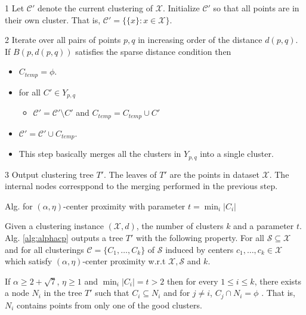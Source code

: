 \documentclass[11pt]{article}
\newcommand{\mc}{\mathcal}
\newenvironment{alg}{
    \begin{list}{}{
        \setlength{\itemsep}{2pt}
        \setlength{\parsep}{0pt}
        \setlength{\parskip}{0pt}
        \setlength{\topsep}{1pt}
    }
}
{
    \end{list}
}
\begin{document}
\begin{algorithm}[!ht]
\begin{alg}
	\item[1] Let $\mc C'$ denote the current clustering of $\mc X$. Initialize $\mc C'$ so that all points are in their own cluster. That is, $\mc C' = \{ \{x\}: x \in \mc X\}$.
	\item[2] Iterate over all pairs of points $p, q$ in increasing order of the distance $d(p, q)$. If $B(p, d(p, q))$ satisfies the sparse distance condition then
	\begin{itemize}
	\renewcommand\labelitemi{}
		\item $C_{temp} = \phi$. 
		\item for all $C' \in Y_{p,q}$
		\begin{itemize}
		\renewcommand\labelitemii{}
			\item $\mc C' = \mc C' \setminus C'$ and $C_{temp} = C_{temp} \cup C'$
		\end{itemize}
		\item $\mc C' = \mc C' \cup C_{temp}$.
		\item This step basically merges all the clusters in $Y_{p, q}$ into a single cluster.
	\end{itemize}
	\item[3] Output clustering tree $T'$. The leaves of $T'$ are the points in dataset $\mc X$. The internal nodes corresppond to the merging performed in the previous step.
\end{alg}
\caption{Alg. for $(\alpha, \eta)$-center proximity with parameter $t = \min_i |C_i|$}
\label{alg:alphacp}
\end{algorithm}


\begin{theorem}
Given a clustering instance $(\mc X, d)$, the number of clusters $k$ and a parameter $t$. Alg. \ref{alg:alphacp} outputs a tree $T'$ with the following property. For all $\mc S \subseteq \mc X$ and for all clusterings $\mc C = \{C_1, \ldots, C_k\}$ of $\mc S$ induced by centers $c_1, \ldots, c_k \in \mc X$ which satisfy $(\alpha, \eta)$-center proximity w.r.t $\mc X, \mc S$ and $k$. 

If $\alpha \ge 2 + \sqrt 7$, $\eta \ge 1$ and $ \min_i|C_i| = t > 2$ then for every $1\le i \le k$, there exists a node $N_i$ in the tree $T'$ such that $C_i \subseteq N_i$ and for $j \neq i$, $C_j \cap N_i = \phi$ . That is, $N_i$ contains points from only one of the good clusters. 
\end{theorem}
\end{document}
